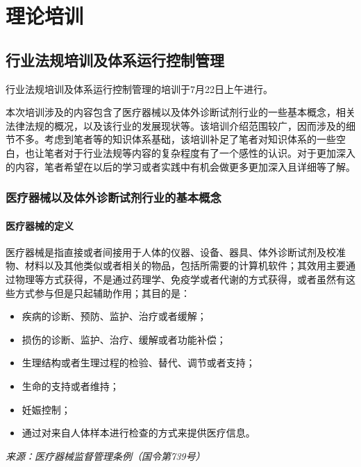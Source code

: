 \documentclass[cn,black,12pt,normal]{elegantnote}
\begin{document}
\section{理论培训}

\subsection{行业法规培训及体系运行控制管理}
行业法规培训及体系运行控制管理的培训于7月22日上午进行。

本次培训涉及的内容包含了医疗器械以及体外诊断试剂行业的一些基本概念，相关法律法规的概况，以及该行业的发展现状等。该培训介绍范围较广，因而涉及的细节不多。考虑到笔者等的知识体系基础，该培训补足了笔者对知识体系的一些空白，也让笔者对于行业法规等内容的复杂程度有了一个感性的认识。对于更加深入的内容，笔者希望在以后的学习或者实践中有机会做更多更加深入且详细等了解。

\subsubsection{医疗器械以及体外诊断试剂行业的基本概念}

\paragraph{医疗器械的定义}
医疗器械是指直接或者间接用于人体的仪器、设备、器具、体外诊断试剂及校准物、材料以及其他类似或者相关的物品，包括所需要的计算机软件；其效用主要通过物理等方式获得，不是通过药理学、免疫学或者代谢的方式获得，或者虽然有这些方式参与但是只起辅助作用；其目的是：
\begin{itemize}
    \item 疾病的诊断、预防、监护、治疗或者缓解；
    \item 损伤的诊断、监护、治疗、缓解或者功能补偿；
    \item 生理结构或者生理过程的检验、替代、调节或者支持；
    \item 生命的支持或者维持；
    \item 妊娠控制；
    \item 通过对来自人体样本进行检查的方式来提供医疗信息。
\end{itemize}
\textit{来源：医疗器械监督管理条例（国令第739号）}
\end{document}
